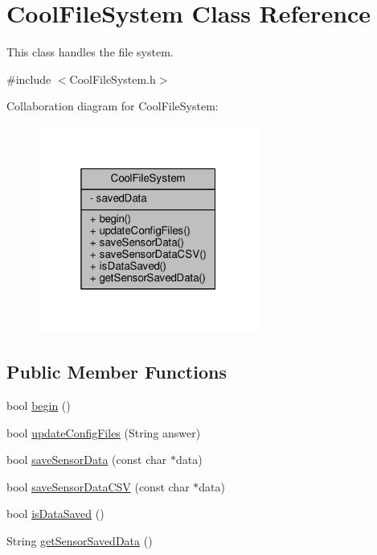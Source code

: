 \hypertarget{classCoolFileSystem}{}\section{Cool\+File\+System Class Reference}
\label{classCoolFileSystem}


This class handles the file system.  




{\ttfamily \#include $<$Cool\+File\+System.\+h$>$}



Collaboration diagram for Cool\+File\+System\+:\nopagebreak
\begin{figure}[H]
\begin{center}
\leavevmode
\includegraphics[width=205pt]{classCoolFileSystem__coll__graph}
\end{center}
\end{figure}
\subsection*{Public Member Functions}
\begin{DoxyCompactItemize}
\item 
bool \hyperlink{classCoolFileSystem_a6ba6f666ed4c530174f8569d2c636748}{begin} ()
\item 
bool \hyperlink{classCoolFileSystem_adfa8e2e80641ae6f0cceabd348a9b841}{update\+Config\+Files} (String answer)
\item 
bool \hyperlink{classCoolFileSystem_afa3a4feae94871d4d3b6bebb701c2e67}{save\+Sensor\+Data} (const char $\ast$data)
\item 
bool \hyperlink{classCoolFileSystem_ab78704d5d21ce10fc6f1138ab5ab46c8}{save\+Sensor\+Data\+C\+SV} (const char $\ast$data)
\item 
bool \hyperlink{classCoolFileSystem_a5a7eaeea7a9fbf8aaef651d862fa3b5b}{is\+Data\+Saved} ()
\item 
String \hyperlink{classCoolFileSystem_a5c58bca3735c0ed3efb268d70ef998ef}{get\+Sensor\+Saved\+Data} ()
\end{DoxyCompactItemize}
